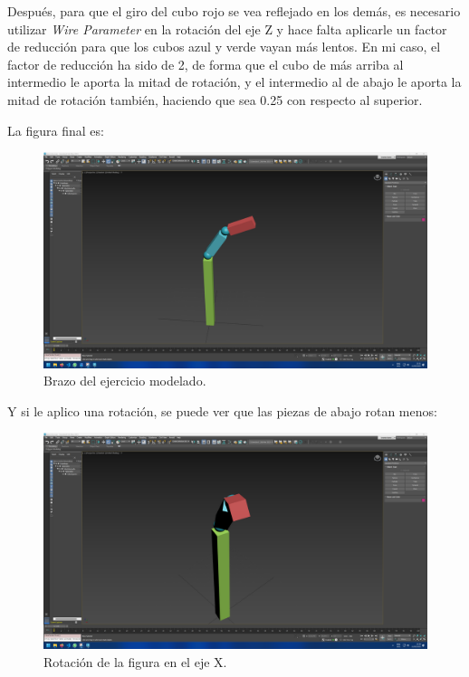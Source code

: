 \documentclass{article}
\begin{document}
Después, para que el giro del cubo rojo se vea reflejado en los demás, es necesario utilizar \textit{Wire Parameter} en la rotación del eje Z y hace falta aplicarle un factor de reducción para que los cubos azul y verde vayan más lentos. En mi caso, el factor de reducción ha sido de 2, de forma que el cubo de más arriba al intermedio le aporta la mitad de rotación, y el intermedio al de abajo le aporta la mitad de rotación también, haciendo que sea 0.25 con respecto al superior.

\bigskip

La figura final es:

\begin{figure}[H]
   \centering
   \includegraphics[width=\textwidth]{imagenes/brazo1mio.png}
   \caption{Brazo del ejercicio modelado.}
\end{figure}

Y si le aplico una rotación, se puede ver que las piezas de abajo rotan menos:

\begin{figure}[H]
   \centering
   \includegraphics[width=\textwidth]{imagenes/brazo2mio.png}
   \caption{Rotación de la figura en el eje X.}
\end{figure}
\end{document}

